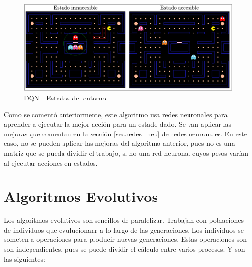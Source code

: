 		
		\begin{figure}[!h]
			\centering
			\includegraphics[width=1\textwidth]{images/chapter_3/pacman_states}	
			\caption{DQN - Estados del entorno}
			\label{fig:pacman_states}
		\end{figure}
		
			
		
		Como se comentó anteriormente, este algoritmo usa redes neuronales para aprender a ejecutar la mejor acción para un estado dado. Se van aplicar las mejoras que comentan en la sección \ref{sec:redes_neu} de redes neuronales. En este caso, no se pueden aplicar las mejoras del algoritmo anterior, pues no es una matriz que se pueda dividir el trabajo, si no una red neuronal cuyos pesos varían al ejecutar acciones en estados. 	
		
		
	
		
	
	\newpage
	


\section{Algoritmos Evolutivos}

	Los algoritmos evolutivos son sencillos de paralelizar. Trabajan con poblaciones de individuos que evulucionanr a lo largo de las generaciones. Los individuos se someten a operaciones para producir nuevas generaciones. Estas operaciones son son independientes, pues se puede dividir el cálculo entre varios procesos. Y son las siguientes: 
	
